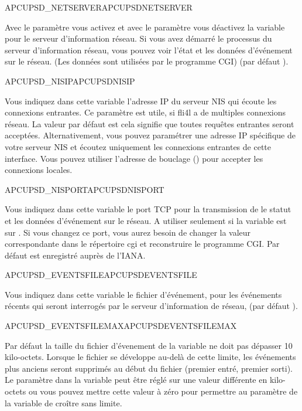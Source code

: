 \begin {description}

 {APCUPSD\_NETSERVER}{APCUPSDNETSERVER}

  Avec le paramètre  vous activez et avec le paramètre 
  vous déactivez la variable pour le serveur d'information réseau. Si vous
  avez démarré le processus du serveur d'information réseau, vous pouvez voir
  l'état et les données d'événement sur le réseau. (Les données sont utilisées
  par le programme CGI) (par défaut ).


 {APCUPSD\_NISIP}{APCUPSDNISIP}

  Vous indiquez dans cette variable l'adresse IP du serveur NIS qui écoute
  les connexions entrantes. Ce paramètre est utile, si fli4l a de multiples
  connexions réseau. La valeur par défaut est  cela signifie
  que toutes requêtes entrantes seront acceptées. Alternativement, vous pouvez
  paramétrer une adresse IP spécifique de votre serveur NIS et écoutez
  uniquement les connexions entrantes de cette interface. Vous pouvez
  utiliser l'adresse de bouclage () pour accepter les
  connexions locales.


 {APCUPSD\_NISPORT}{APCUPSDNISPORT}

  Vous indiquez dans cette variable le port TCP pour la transmission
  de le statut et les données d'événement sur le réseau. A utiliser
  seulement si la variable 
  est sur . Si vous changez ce port, vous aurez besoin de changer
  la valeur correspondante dans le répertoire cgi et reconstruire le programme CGI.
  Par défaut  est enregistré auprès de l'IANA.


 {APCUPSD\_EVENTSFILE}{APCUPSDEVENTSFILE}

  Vous indiquez dans cette variable le fichier d'événement, pour les
  événements récents qui seront interrogés par le serveur d'information
  de réseau, (par défaut ).


 {APCUPSD\_EVENTSFILEMAX}{APCUPSDEVENTSFILEMAX}

  Par défaut la taille du fichier d'évenement de la variable
  ne doit pas dépasser 10 kilo-octets. Lorsque le fichier se développe au-delà
  de cette limite, les événements plus anciens seront supprimés au début du fichier
  (premier entré, premier sorti). Le paramètre dans la variable 
  peut être réglé sur une valeur différente en kilo-octets ou vous pouvez mettre
  cette valeur à zéro pour permettre au paramètre de la variable
   de croître sans limite.

\end {description}

